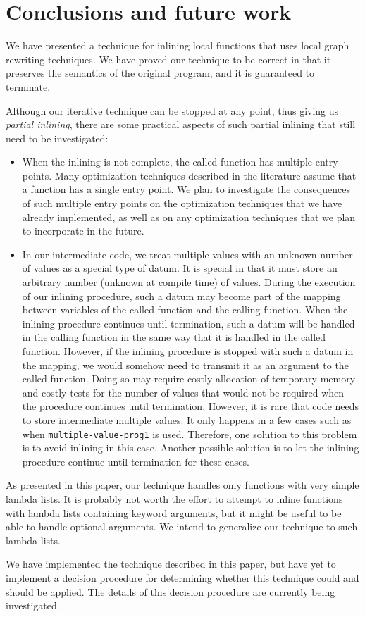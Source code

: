 \section{Conclusions and future work}
\label{sec-conclusions}

We have presented a technique for inlining local functions that uses
local graph rewriting techniques.  We have proved our technique to be
correct in that it preserves the semantics of the original program,
and it is guaranteed to terminate.

Although our iterative technique can be stopped at any point, thus
giving us \emph{partial inlining}, there are some practical aspects of
such partial inlining that still need to be investigated:

\begin{itemize}
\item When the inlining is not complete, the called function has
  multiple entry points.  Many optimization techniques described in
  the literature assume that a function has a single entry point.  We
  plan to investigate the consequences of such multiple entry points
  on the optimization techniques that we have already implemented, as
  well as on any optimization techniques that we plan to incorporate
  in the future.
\item In our intermediate code, we treat multiple values with an
  unknown number of values as a special type of datum.  It is special
  in that it must store an arbitrary number (unknown at compile time)
  of values.  During the execution of our inlining procedure, such a
  datum may become part of the mapping between variables of the called
  function and the calling function.  When the inlining procedure
  continues until termination, such a datum will be handled in the
  calling function in the same way that it is handled in the called
  function.  However, if the inlining procedure is stopped with such a
  datum in the mapping, we would somehow need to transmit it as an
  argument to the called function.  Doing so may require costly
  allocation of temporary memory and costly tests for the number of
  values that would not be required when the procedure continues until
  termination.  However, it is rare that code needs to store
  intermediate multiple values.  It only happens in a few cases such
  as when \texttt{multiple-value-prog1} is used.  Therefore, one
  solution to this problem is to avoid inlining in this case.  Another
  possible solution is to let the inlining procedure continue until
  termination for these cases.
\end{itemize}

As presented in this paper, our technique handles only functions with
very simple lambda lists.  It is probably not worth the effort to
attempt to inline functions with lambda lists containing keyword
arguments, but it might be useful to be able to handle optional
arguments.  We intend to generalize our technique to such lambda lists.

We have implemented the technique described in this paper, but have
yet to implement a decision procedure for determining whether this
technique could and should be applied.  The details of this decision
procedure are currently being investigated.
